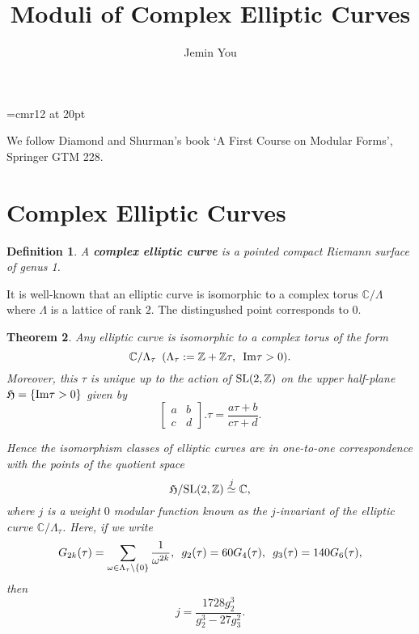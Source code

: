 \documentclass[a4paper,11pt]{article}
\begin{document}
\theoremstyle{plain}
\newtheorem{thm}{Theorem}[section]
\newtheorem{defn}[thm]{Definition}
\newtheorem{exm}[thm]{Example}
\newtheorem{prp}[thm]{Proposition}
\newtheorem{rem}[thm]{Remark}
\newtheorem{lem}[thm]{Lemma}

\font\myfont=cmr12 at 20pt

\title{\vspace{-5ex} \myfont Moduli of Complex Elliptic Curves}
\author{Jemin You}
\date{\vspace{-5ex}}
\maketitle

\setcounter{section}{0}

We follow Diamond and Shurman's book `A First Course on Modular Forms', Springer GTM 228.

\section{Complex Elliptic Curves}

\begin{defn}
A \textbf{complex elliptic curve} is a pointed compact Riemann surface of genus 1.
\end{defn}

It is well-known that an elliptic curve is isomorphic to a complex torus $\mathbb{C}/\Lambda$ where $\Lambda$ is a lattice of rank $2$.
The distingushed point corresponds to $0$.

\begin{thm}
Any  elliptic curve is isomorphic to a complex torus of the form
\[
\mathbb{C}/\Lambda_{\tau} \enskip (\Lambda_{\tau}:=\mathbb{Z}+\mathbb{Z}\tau, \enskip \textnormal{Im}\tau > 0).
\]
Moreover, this $\tau$ is unique up to the action of $\textnormal{SL}(2,\mathbb{Z})$ on the upper half-plane $\mathfrak{H}=\{\textnormal{Im}\tau>0\}$ given by
\[
\begin{bmatrix} a & b \\ c & d \end{bmatrix}.\tau = \frac{a\tau+b}{c\tau+d}.
\]

Hence the isomorphism classes of elliptic curves are in one-to-one correspondence with the points of the quotient space
\[
\mathfrak{H}/\textnormal{SL}(2,\mathbb{Z}) \stackrel{j}{\simeq} \mathbb{C},
\]
where $j$ is a weight $0$ modular function known as the $j$-invariant of the elliptic curve $\mathbb{C}/\Lambda_{\tau}$.
Here, if we write
\[
G_{2k}(\tau)=\sum_{\omega \in \Lambda_{\tau} \setminus \{0\}}\frac{1}{\omega^{2k}}, \enskip
g_2(\tau)=60G_4(\tau), \enskip g_3(\tau)=140G_6(\tau),
\]
then
\[
j=\frac{1728g_2^3}{g_2^3-27g_3^2}.
\]
\end{thm}
\end{document}
